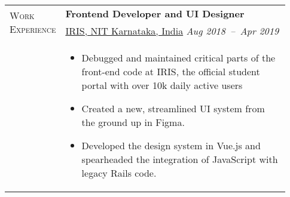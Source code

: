\documentclass[letterpaper, 10pt, oneside]{article}
\newcommand{\stitle}[1]{\normalsize{\textsc{#1}}}
\newcommand{\bdit}[1]{{\textbf{#1}}}
\begin{document}
\begin{longtable}{@{} p{0.13\linewidth} p{0.8\linewidth}}
    \multirow{2}{6.5em}{\stitle{Work Experience}}     & \bdit{Frontend Developer and UI Designer}                                                                                                                                                             \\
                                                      & \href{https://iris.nitk.ac.in/about_us}{IRIS, NIT Karnataka, India} \hfill \textsl{Aug 2018\ --\ Apr 2019}                                                                                            \\
                                                      & \parbox{0.8\textwidth}{                                                                                                                                                                               %
        \begin{itemize}[leftmargin=*, itemsep=-0.88ex, topsep=-0.88ex]
            \item Debugged and maintained critical parts of the front-end code at IRIS, the official student portal with over 10k daily active users
            \item Created a new, streamlined UI system from the ground up in Figma.
            \item Developed the design system in Vue.js and spearheaded the integration of JavaScript with legacy Rails code.
        \end{itemize}
    }
    \\
    \\


\end{longtable}
\end{document}
